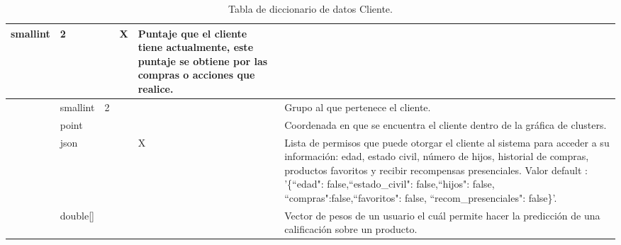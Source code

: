 \begin{table}[htb]
\begin{tabular}{|p{2.5cm}|p{1.5cm}|p{1.5cm}|p{1.5cm}|p{1.5cm}|p{5.5cm}|}
	smallint &
	 2 &
	 &
	X  & 
	Puntaje que el cliente tiene actualmente, este puntaje se obtiene por las compras o acciones que realice. \\ 
	\hline
	\cellcolor[HTML]{9B9B9B}{\color[HTML]{FFFFFF} grupo } &
	smallint &
	 2 &
	 &
	 & 
	Grupo al que pertenece el cliente. \\ 
	\hline
	\cellcolor[HTML]{9B9B9B}{\color[HTML]{FFFFFF} posicion } &
	point &
	 &
	 &
	 & 
	Coordenada en que se encuentra el cliente dentro de la gráfica de clusters. \\ 
	\hline
	\cellcolor[HTML]{9B9B9B}{\color[HTML]{FFFFFF} permisos } &
	json &
	  &
	 &
	X  & 
	Lista de permisos que puede otorgar el cliente al sistema para acceder a su información: edad, estado civil, número de hijos, historial de compras, productos favoritos y recibir recompensas presenciales. Valor default : '\{``edad": false,``estado\_civil": false,``hijos": false, ``compras":false,``favoritos": false, ``recom\_presenciales": false\}'.   \\ 
	\hline
	\cellcolor[HTML]{9B9B9B}{\color[HTML]{FFFFFF} thetas } &
	double[] &
	  &
	 &
	 & 
	Vector de pesos de un usuario el cuál permite hacer la predicción de una calificación sobre un producto.   \\ 
	\hline
	
	
\end{tabular}

\caption{Tabla de diccionario de datos Cliente. }
\label{table:dic4-Cliente}
\end{table}
\FloatBarrier

